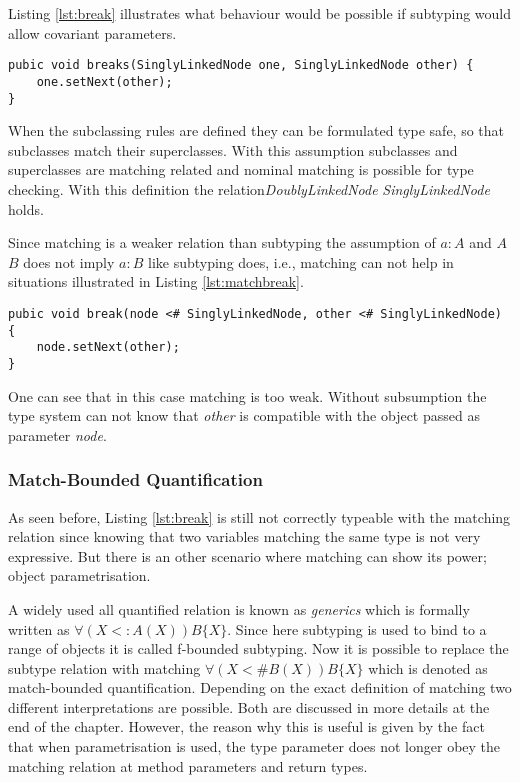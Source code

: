 Listing \ref{lst:break} illustrates what behaviour would be possible if subtyping
would allow covariant parameters.

\begin{lstlisting}[float=h,label={lst:break},caption={Breaking a doubly linked node}]
pubic void breaks(SinglyLinkedNode one, SinglyLinkedNode other) {
	one.setNext(other);
}
\end{lstlisting}

When the subclassing rules are defined they can be formulated
type safe, so that subclasses match their superclasses. With
this assumption subclasses and superclasses are matching related and
nominal matching is possible for type checking. With this definition
the relation\emph{DoublyLinkedNode} \match \emph{SinglyLinkedNode} holds.

Since matching is a weaker relation than subtyping the assumption of $a:A$
and $A$ \match $B$ does not imply $a:B$ like subtyping does, i.e., matching
can not help in situations illustrated in Listing \ref{lst:matchbreak}.

\begin{lstlisting}[float=h,label={lst:matchbreak},caption={Matching relation in the break method}]
pubic void break(node <# SinglyLinkedNode, other <# SinglyLinkedNode) {
	node.setNext(other);
}
\end{lstlisting}

One can see that in this case matching is too weak. Without subsumption
the type system can not know that \emph{other} is compatible with the
object passed as parameter \emph{node}.

\subsubsection{Match-Bounded Quantification}
As seen before, Listing \ref{lst:break} is still not correctly typeable
with the matching relation since knowing that two variables matching
the same type is not very expressive. But there is an other scenario
where matching can show its power; object parametrisation.

A widely used all quantified relation is known as \emph{generics}
which is formally written as $\forall (X <: A(X))B\{X\}$. Since here
subtyping is used to bind \X to a range of objects it is called f-bounded
subtyping. Now it is possible to replace the subtype relation with
matching $\forall(X <\# B(X))B\{X\}$ which is denoted as match-bounded
quantification. Depending on the exact definition of matching two
different interpretations are possible\cite{abadi_subtyping_1996}. Both
are discussed in more details at the end of the chapter. However, the
reason why this is useful is given by the fact that when parametrisation
is used, the type parameter does not longer obey the matching relation
at method parameters and return types.

